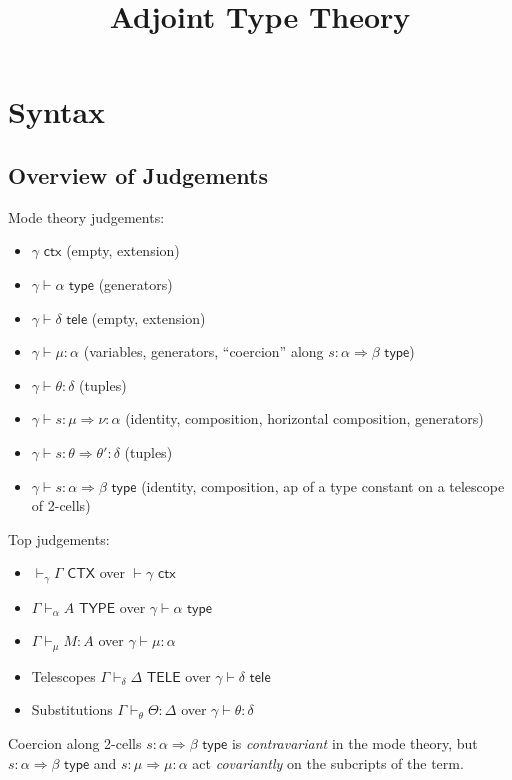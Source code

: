 \documentclass[10pt]{article}
\title{Adjoint Type Theory}
\author{}
\date{}
\newcommand{\yields}{\vdash}
\newcommand{\CTX}{\,\,\mathsf{CTX}}
\newcommand{\ctx}{\,\,\mathsf{ctx}}
\newcommand{\TYPE}{\,\,\mathsf{TYPE}}
\newcommand{\type}{\,\,\mathsf{type}}
\newcommand{\TELE}{\,\,\mathsf{TELE}}
\newcommand{\tele}{\,\,\mathsf{tele}}
\begin{document}
\maketitle

\section{Syntax}

\subsection{Overview of Judgements}

Mode theory judgements:
\begin{itemize}
\item $\gamma \ctx$ (empty, extension)
\item $\gamma \yields \alpha \type$ (generators)
\item $\gamma \yields \delta \tele$ (empty, extension)
\item $\gamma \yields \mu : \alpha$ (variables, generators, ``coercion''
  along $s : \alpha \Rightarrow \beta \type$)
\item $\gamma \yields \theta : \delta$ (tuples)
\item $\gamma \yields s : \mu \Rightarrow \nu : \alpha$ (identity,
  composition, horizontal composition, generators)
\item $\gamma \yields s : \theta \Rightarrow \theta' : \delta$ (tuples)
\item $\gamma \yields s : \alpha \Rightarrow \beta \type$ (identity,
  composition, ap of a type constant on a telescope of 2-cells)
\end{itemize}
Top judgements: 
\begin{itemize}
\item $\yields_\gamma \Gamma \CTX$ over $\yields \gamma \ctx$
\item $\Gamma \yields_\alpha A \TYPE$ over $\gamma \yields \alpha \type$
\item $\Gamma \yields_\mu M : A$ over $\gamma \yields \mu : \alpha$
\item Telescopes $\Gamma \yields_\delta \Delta \TELE$ over $\gamma \yields \delta \tele$
\item Substitutions $\Gamma \yields_\theta \Theta : \Delta$ over $\gamma \yields \theta : \delta$
\end{itemize}

Coercion along 2-cells $s : \alpha \Rightarrow \beta \type$ is
\emph{contravariant} in the mode theory, but $s : \alpha \Rightarrow
\beta \type$ and $s : \mu \Rightarrow \mu : \alpha$ act \emph{covariantly}
on the subcripts of the term.
\end{document}
